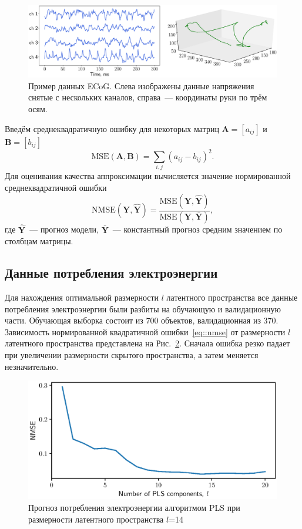 \documentclass[12pt,twoside]{article}
\newcommand{\bY}{\mathbf{Y}}
\begin{document}
\begin{figure}
	\includegraphics[width=\linewidth]{figs/ecog_data.eps}
	\caption{Пример данных ECoG. Слева изображены данные напряжения снятые с нескольких каналов, справа~--- координаты руки по трём осям.}
	\label{fig::ecog_data}
\end{figure}

Введём среднеквадратичную ошибку для некоторых матриц $\mathbf{A} = [a_{ij}]$ и $\mathbf{B} = [b_{ij}]$
\[
\text{MSE} (\mathbf{A}, \mathbf{B}) = \sum_{i,j} (a_{ij} - b_{ij})^2.
\]
Для оценивания качества аппроксимации вычисляется значение нормированной среднеквадратичной ошибки
\begin{equation}
\text{NMSE}(\bY,  \mathbf{\hat{Y}}) = \frac{\text{MSE} (\bY, \mathbf{\hat{Y}})}{\text{MSE} (\bY, \mathbf{\bar{Y}})},
\label{eq::nmse}
\end{equation}
где $\mathbf{\hat{Y}}$~--- прогноз модели, $\mathbf{\bar{Y}}$~--- константный прогноз средним значением по столбцам матрицы.

\subsection{Данные потребления электроэнергии}

Для нахождения оптимальной размерности $l$ латентного пространства все данные потребления электроэнергии были разбиты на обучающую и валидационную части. 
Обучающая выборка состоит из $700$ объектов, валидационная из $370$. Зависимость нормированной квадратичной ошибки~\eqref{eq::nmse} от размерности $l$ латентного пространства представлена на Рис.~\ref{fig::energy_n_comp}. 
Сначала ошибка резко падает при увеличении размерности скрытого пространства, а затем меняется незначительно.

\begin{figure}[!h]
	\centering
	\includegraphics[width=0.75\linewidth]{figs/energy_n_comp}
	\caption{Прогноз потребления электроэнергии алгоритмом PLS при размерности латентного пространства $l$=14}
	\label{fig::energy_n_comp}
\end{figure}
\end{document}
